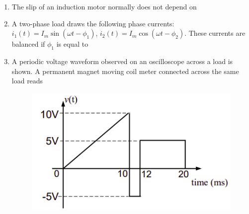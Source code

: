 \documentclass[journal,12pt,onecolumn]{IEEEtran}
\theoremstyle{remark}
\begin{document}
\begin{enumerate}[start=1, label=Q.\arabic*]
\item The slip of an induction motor normally does not depend on

\begin{enumerate}
\end{enumerate}
\hfill{}

\item A two-phase load draws the following phase currents: $i_{1}(t)=I_{m}\sin(\omega t-\phi_{1})$, $i_{2}(t)=I_{m}\cos(\omega t-\phi_{2})$. These currents are balanced if $\phi_{1}$ is equal to

\begin{enumerate}
\end{enumerate}
\hfill{}

\item A periodic voltage waveform observed on an oscilloscope across a load is shown. A permanent magnet moving coil  meter connected across the same load reads
\begin{figure}[H]
    \centering
    \includegraphics[width=0.4\columnwidth]{Figures/q12.png}
    \caption{}
\end{figure}

\begin{enumerate}
\end{enumerate}
\hfill{}


\end{enumerate}
\end{document}
